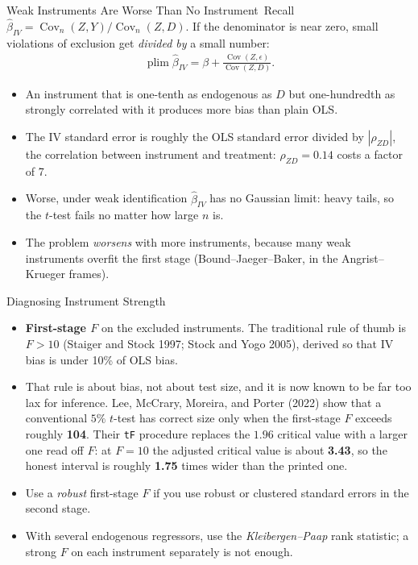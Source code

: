 \documentclass[aspectratio=169,11pt,xcolor=dvipsnames]{beamer}
\newcommand{\srcp}[1]{{\scriptsize\color{gray}(#1)}}
\newcommand{\srct}[1]{#1}
\DeclareMathOperator{\Cov}{Cov}
\DeclareMathOperator{\plim}{plim}
\newcommand{\core}{\,\raisebox{0.6pt}{\textcolor{corestar}{$\bigstar$}}}
\begin{document}
\begin{frame}{Weak Instruments Are Worse Than No Instrument\core}
Recall $\hat\beta_{IV} = \Cov_n(Z,Y)/\Cov_n(Z,D)$. If the denominator
is near zero, small violations of exclusion get \emph{divided by} a small number:
\begin{align*}
  \plim \hat\beta_{IV} = \beta + \frac{\Cov(Z,\epsilon)}{\Cov(Z,D)} .
\end{align*}
\vskip3pt
\begin{itemize}\itemsep3pt
  \item An instrument that is one-tenth as endogenous as $D$ but one-hundredth as
        strongly correlated with it produces \alert{more} bias than plain OLS.
  \item The IV standard error is roughly the OLS standard error divided by
        $|\rho_{ZD}|$, the correlation between instrument and treatment: $\rho_{ZD} = 0.14$ costs a factor of 7.
  \item Worse, under weak identification $\hat\beta_{IV}$ has \alert{no Gaussian
        limit}: heavy tails, so the $t$-test fails no matter how large $n$ is.
  \item The problem \emph{worsens} with more instruments, because many weak
        instruments overfit the first stage (Bound--Jaeger--Baker, in the
        Angrist--Krueger frames).
\end{itemize}
\end{frame}

\begin{frame}{Diagnosing Instrument Strength\core}
\begin{itemize}\itemsep3pt
  \item \textbf{First-stage $F$} on the excluded instruments. The traditional rule
        of thumb is $F > 10$ \srcp{Staiger and Stock 1997; Stock and Yogo 2005},
        derived so that IV bias is under 10\% of OLS bias.
  \item \alert{That rule is about bias, not about test size, and it is now known
        to be far too lax for inference.}
        \srct{Lee, McCrary, Moreira, and Porter (2022)} show that a conventional
        $5\%$ $t$-test has correct size only when the first-stage $F$ exceeds
        roughly \textbf{104}. Their \texttt{tF} procedure replaces the $1.96$
        critical value with a larger one read off $F$: at $F = 10$ the adjusted
        critical value is about \textbf{3.43}, so the honest interval is roughly
        \textbf{1.75} times wider than the printed one.
  \item Use a \emph{robust} first-stage $F$ if you use robust or clustered
        standard errors in the second stage.
  \item With several endogenous regressors, use the \emph{Kleibergen--Paap} rank
        statistic; a strong $F$ on each instrument separately is not enough.
\end{itemize}
\end{frame}
\end{document}
